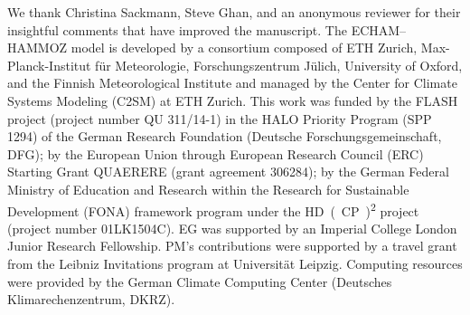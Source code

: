 \documentclass[acp, manuscript]{copernicus}\usepackage[]{graphicx}\usepackage[]{color}
\begin{document}

\begin{acknowledgements}
  We thank Christina Sackmann, Steve Ghan, and an anonymous reviewer for their
  insightful comments that have improved the manuscript.  The ECHAM--HAMMOZ
  model is developed by a consortium composed of ETH Zurich, Max-Planck-Institut
  für Meteorologie, Forschungszentrum Jülich, University of Oxford, and the
  Finnish Meteorological Institute and managed by the Center for Climate Systems
  Modeling (C2SM) at ETH Zurich.  This work was funded by the FLASH project
  (project number QU 311/14-1) in the HALO Priority Program (SPP 1294) of the
  German Research Foundation (Deutsche Forschungsgemeinschaft, DFG); by the
  European Union through European Research Council (ERC) Starting Grant QUAERERE
  (grant agreement 306284); by the German Federal Ministry of Education and
  Research within the Research for Sustainable Development (FONA) framework
  program under the \unit{HD(CP)^2} project (project number 01LK1504C).  EG was
  supported by an Imperial College London Junior Research Fellowship.  PM's
  contributions were supported by a travel grant from the Leibniz Invitations
  program at Universität Leipzig.  Computing resources were provided by the
  German Climate Computing Center (Deutsches Klimarechenzentrum, DKRZ).
\end{acknowledgements}













\end{document}
